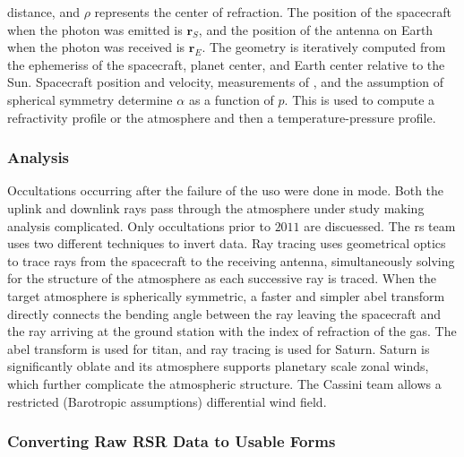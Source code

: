 \documentclass[oneside]{book}
\theoremstyle{mystyle}
\begin{document}
\noindent distance, and $\rho$ represents the center of refraction. The position of the spacecraft when the photon was emitted is $\mathbf{r}_{S}$, and the position of the antenna on Earth when the photon was received is $\mathbf{r}_{E}$. The geometry is iteratively computed from the \glspl{ephemeris} of the spacecraft, planet center, and Earth center relative to the Sun. Spacecraft position and velocity, measurements of , and the assumption of spherical symmetry determine $\alpha$ as a function of $p$. This is used to compute a refractivity profile or the \gls{atmosphere} and then a \gls{temperature-pressure profile}.

\subsubsection{\footnotesize Analysis}

Occultations occurring after the failure of the \gls{uso} were done in  mode. Both the \gls{uplink} and \gls{downlink} rays pass through the \gls{atmosphere} under study making analysis complicated. Only \glspl{occultation} prior to $2011$ are discuessed. The \gls{rs} team uses two different techniques to invert  data. Ray tracing uses geometrical optics to trace rays from the spacecraft to the receiving antenna, simultaneously solving for the structure of the \gls{atmosphere} as each successive ray is traced. When the target \gls{atmosphere} is spherically symmetric, a faster and simpler \gls{abel transform} directly connects the \gls{bending angle} between the ray leaving the spacecraft and the ray arriving at the ground station with the index of refraction of the gas. The \gls{abel transform} is used for \gls{titan}, and ray tracing is used for Saturn. Saturn is significantly oblate and its atmosphere supports planetary scale zonal winds, which further complicate the atmospheric structure. The Cassini team allows a restricted (Barotropic assumptions) differential wind field.

\subsubsection{\footnotesize Converting Raw RSR Data to Usable Forms}
\end{document}
